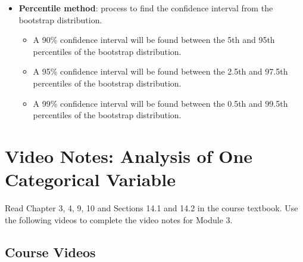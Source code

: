 \documentclass[
]{report}
\newenvironment{Shaded}{\begin{snugshade}}{\end{snugshade}}
\newcommand{\AttributeTok}[1]{\textcolor[rgb]{0.13,0.29,0.53}{#1}}
\newcommand{\CommentTok}[1]{\textcolor[rgb]{0.56,0.35,0.01}{\textit{#1}}}
\newcommand{\DecValTok}[1]{\textcolor[rgb]{0.00,0.00,0.81}{#1}}
\newcommand{\FloatTok}[1]{\textcolor[rgb]{0.00,0.00,0.81}{#1}}
\newcommand{\FunctionTok}[1]{\textcolor[rgb]{0.13,0.29,0.53}{\textbf{#1}}}
\newcommand{\NormalTok}[1]{#1}
\begin{document}
\begin{itemize}
  R code to use simulation methods for one categorical variable to find a confidence interval, \texttt{one\_proportion\_bootstrap\_CI} (from the \texttt{catstats} package), is shown below.

\begin{Shaded}
\begin{Highlighting}[]
\FunctionTok{one\_proportion\_bootstrap\_CI}\NormalTok{(}\AttributeTok{sample\_size =}\NormalTok{ xx, }\CommentTok{\# Sample size}
                \AttributeTok{number\_successes =}\NormalTok{ xx, }\CommentTok{\# Observed number of successes}
                \AttributeTok{number\_repetitions =} \DecValTok{10000}\NormalTok{, }\CommentTok{\# Number of bootstrap samples to use}
                \AttributeTok{confidence\_level =} \FloatTok{0.95}\NormalTok{) }\CommentTok{\# Confidence level as a decimal}
\end{Highlighting}
\end{Shaded}
\item
  \textbf{Percentile method}: process to find the confidence interval from the bootstrap distribution.

  \begin{itemize}
  \item
    A 90\% confidence interval will be found between the 5th and 95th percentiles of the bootstrap distribution.
  \item
    A 95\% confidence interval will be found between the 2.5th and 97.5th percentiles of the bootstrap distribution.
  \item
    A 99\% confidence interval will be found between the 0.5th and 99.5th percentiles of the bootstrap distribution.
  \end{itemize}
\end{itemize}

\newpage

\section{Video Notes: Analysis of One Categorical Variable}\label{video-notes-analysis-of-one-categorical-variable}

Read Chapter 3, 4, 9, 10 and Sections 14.1 and 14.2 in the course textbook. Use the following videos to complete the video notes for Module 3.

\subsection{Course Videos}\label{course-videos-2}
\end{document}
